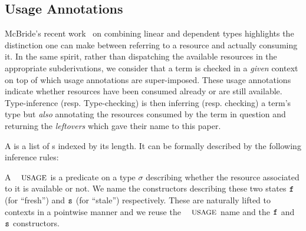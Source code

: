 \documentclass[a4paper,UKenglish]{lipics-v2016}
\begin{document}
\subsection{Usage Annotations}

McBride's recent work~\cite{mcbride2016got} on combining linear and
dependent types highlights the distinction one can make between
referring to a resource and actually consuming it. In the same spirit,
rather than dispatching the available resources in the appropriate
subderivations, we consider that a term is checked in a \emph{given}
context on top of which usage annotations are super-imposed. These
usage annotations indicate whether resources have been consumed already
or are still available. Type-inference (resp. Type-checking) is then
inferring (resp. checking) a term's type but \emph{also} annotating
the resources consumed by the term in question and returning the
\emph{leftovers} which gave their name to this paper.

\begin{definition}
\label{definition:context}
A \Context{} is a list of \Type{}s indexed by its length. It can
be formally described by the following inference rules:
\end{definition}


\begin{definition}
\label{definition:usage}
A $\Usage{}$ is a predicate on a type $σ$ describing whether the
resource associated to it is available or not. We name the
constructors describing these two states $\texttt{f}_{}$ (for ``fresh'')
and $\texttt{s}_{}$ (for ``stale'') respectively.
 These are naturally
lifted to contexts in a pointwise manner and we reuse the $\Usage{}$
name and the $\texttt{f}_{}$ and $\texttt{s}_{}$ constructors.

\end{definition}
\end{document}
